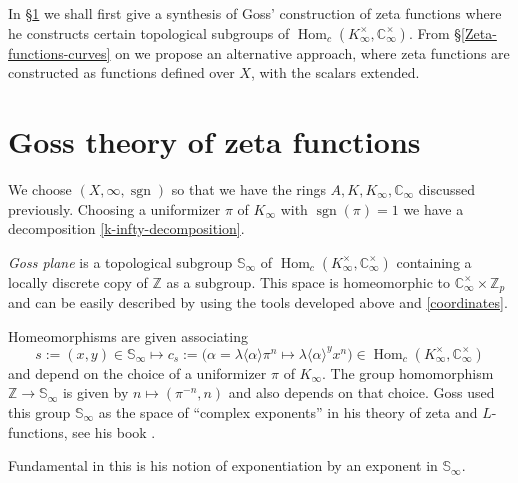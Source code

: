 \documentclass[11pt]{amsart}
\numberwithin{equation}{section}
\newcommand{\ZZ}{\mathbb{Z}}
\newcommand{\CC}{\mathbb{C}}
\newcommand{\sgn}{\operatorname{sgn}}
\begin{document}
In \S \ref{Goss-theory-zeta-functions} we shall first give a synthesis of Goss' construction of zeta functions where he constructs certain topological subgroups of $\operatorname{Hom}_c(K_\infty^\times,\CC_\infty^\times)$. From \S \ref{Zeta-functions-curves} on we propose an alternative approach, where zeta functions are constructed as functions defined over $X$, with the scalars extended.

\section{Goss theory of zeta functions}\label{Goss-theory-zeta-functions}
We choose $(X,\infty,\sgn)$ so that we have the rings $A,K,K_\infty,\CC_\infty$ discussed previously. Choosing a uniformizer 
$\pi$ of $K_\infty$ with $\sgn(\pi)=1$ we have a decomposition \eqref{k-infty-decomposition}.

{\em Goss plane} is a topological subgroup $\mathbb{S}_\infty$ of $\operatorname{Hom}_c(K_\infty^\times,\CC_\infty^\times)$ containing a locally discrete copy of $\ZZ$ as a subgroup. This space is homeomorphic to $\CC_\infty^\times\times \ZZ_p$
and can be easily described by using the tools developed above and \eqref{coordinates}. 

Homeomorphisms are given associating 
$$s:=(x,y)\in\mathbb{S}_\infty\mapsto c_s:=\Big(\alpha=\lambda\langle\alpha\rangle\pi^n\mapsto \lambda\langle\alpha\rangle^y x^n\Big)\in \operatorname{Hom}_c(K_\infty^\times,\CC_\infty^\times)$$
and depend on the choice of a uniformizer $\pi$ of $K_\infty$. The group homomorphism $\ZZ\rightarrow\mathbb{S}_\infty$ is given by $n\mapsto (\pi^{-n},n)$  and also depends on that choice.
Goss used this group $\mathbb{S}_\infty$ as the space of ``complex exponents'' in his theory of zeta and $L$-functions, see his book \cite{GOS}. 

Fundamental in this is his notion of exponentiation by an exponent in $\mathbb{S}_\infty$. 

\end{document}
